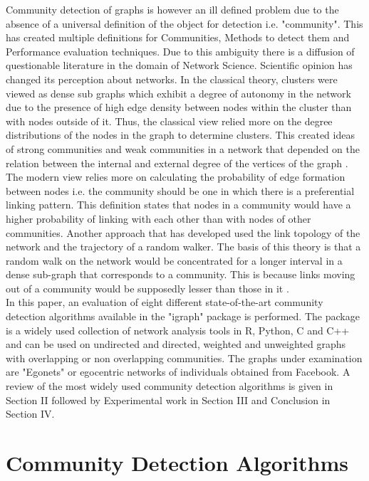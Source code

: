 Community detection of graphs is however an ill defined problem due to the absence of a universal definition of the object for detection i.e. "community". This has created multiple definitions for Communities, Methods to detect them and Performance evaluation techniques. Due to this ambiguity there is a diffusion of questionable literature in the domain of Network Science. Scientific opinion has changed its perception about networks. In the classical theory, clusters were viewed as dense sub graphs which exhibit a degree of autonomy in the network due to the presence of high edge density between nodes within the cluster than with nodes outside of it. Thus, the classical view relied more on the degree distributions of the nodes in the graph to determine clusters. This created ideas of strong communities and weak communities in a network that depended on the relation between the internal and external degree of the vertices of the graph \cite{aps:27}. The modern view relies more on calculating the probability of edge formation between nodes i.e. the community should be one in which there is a preferential linking pattern. This definition states that nodes in a community would have a higher probability of linking with each other than with nodes of other communities. Another approach that has developed used the link topology of the network and the trajectory of a random walker. The basis of this theory is that a random walk on the network would be concentrated for a longer interval in a dense sub-graph that corresponds to a community. This is because links moving out of a community would be supposedly lesser than those in it \cite{aps:28}. \\

In this paper, an evaluation of eight different state-of-the-art community detection algorithms available in the "igraph" package is performed. The package is a widely used collection of network analysis tools in R, Python, C and C++ and can be used on undirected and directed, weighted and unweighted graphs with overlapping or non overlapping communities. The graphs under examination are "Egonets" or egocentric networks of individuals obtained from Facebook. A review of the most widely used community detection algorithms is given in Section II followed by Experimental work in Section III and Conclusion in Section IV.


\section{Community Detection Algorithms}

